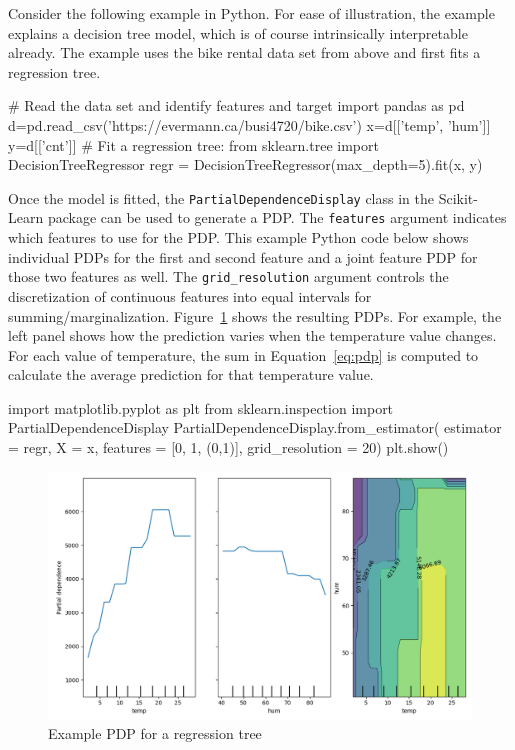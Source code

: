 Consider the following example in Python. For ease of illustration, the example explains a decision tree model, which is of course intrinsically interpretable already. The example uses the bike rental data set from above and first fits a regression tree.

\begin{samepage}
\begin{pythoncode}
# Read the data set and identify features and target
import pandas as pd
d=pd.read_csv('https://evermann.ca/busi4720/bike.csv')
x=d[['temp', 'hum']]
y=d[['cnt']]
# Fit a regression tree:
from sklearn.tree import DecisionTreeRegressor
regr = DecisionTreeRegressor(max_depth=5).fit(x, y)
\end{pythoncode}
\end{samepage}

Once the model is fitted, the \texttt{PartialDependenceDisplay} class in the Scikit-Learn package can be used to generate a PDP. The \texttt{features} argument indicates which features to use for the PDP. This example Python code below shows individual PDPs for the first and second feature and a joint feature PDP for those two features as well. The \texttt{grid\_resolution} argument controls the discretization of continuous features into equal intervals for summing/marginalization. Figure~\ref{fig:pdp} shows the resulting PDPs. For example, the left panel shows how the prediction varies when the temperature value changes. For each value of temperature, the sum in Equation~\ref{eq:pdp} is computed to calculate the average prediction for that temperature value.

\begin{samepage}
\begin{pythoncode}
import matplotlib.pyplot as plt
from sklearn.inspection import PartialDependenceDisplay
PartialDependenceDisplay.from_estimator(
    estimator = regr, 
    X = x, features = [0, 1, (0,1)], grid_resolution = 20)
plt.show()
\end{pythoncode}
\end{samepage}

\begin{figure}
\centering
\includegraphics[width=.75\textwidth]{pdp_dtr.png}
\caption{Example PDP for a regression tree}
\label{fig:pdp}
\end{figure}

